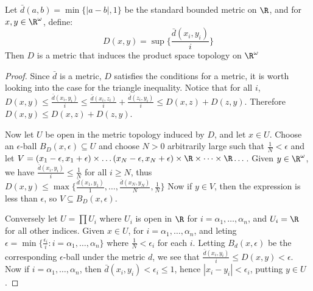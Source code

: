 \begin{theorem}\label{2.2.10}
    Let $\bar{d}(a,b)=\min\{|a-b|,1\}$ be the standard bounded metric on $\R$,
    and for  $x,y \in \R^\omega$, define:
    \begin{equation}
        D(x,y) = \sup\{\frac{\bar{d}(x_i,y_i)}{i}\}
    \end{equation}
    Then $D$ is a metric that induces the product space topology on $\R^\omega$
\end{theorem}
\begin{proof}
    Since $\bar{d}$ is a metric, $D$ satisfies the conditions for a metric, it
    is worth looking into the case for the triangle inequality. Notice that for
    all  $i$,  $D(x,y) \leq \frac{\bar{d}(x_i,y_i)}{i} \leq
    \frac{\bar{d}(x_i,z_i)}{i}+\frac{\bar{d}(z_i,y_i)}{i} \leq D(x,z)+D(z,y)$.
    Therefore $D(x,y) \leq D(x,z)+D(z,y)$.

    Now let $U$ be open in the metric topology induced by  $D$, and let  $x \in
    U$. Choose an  $\epsilon$-ball  $B_D(x,\epsilon) \subseteq U$ and choose
    $N>0$ arbitrarily large such that  $\frac{1}{N}<\epsilon$ and let
    $V=(x_1-\epsilon, x_1+\epsilon) \times \dots (x_N-\epsilon, x_N+\epsilon)
    \times \R \times \dots \times \R \dots$. Given $y \in \R^\omega$, we have
    $\frac{\bar{d}(x_i,y_i)}{i} \leq \frac{1}{N}$ for all $i \geq N$, thus
    $D(x,y) \leq \max\{\frac{\bar{d}(x_1,y_1)}{1}, \dots,
        \frac{\bar{d}(x_N,y_N)}{N}, \frac{1}{N}\}$ Now if $y \in V$, then the
        expression is less than  $\epsilon$, so  $V \subseteq B_D(x, \epsilon)$.

        Conversely let $U=\prod{U_i}$ where $U_i$ is open in  $\R$ for  $i =
        \alpha_1, \dots, \alpha_n$, and $U_i=\R$ for all other indices. Given
        $x \in U$, for $i=\alpha_1, \dots, \alpha_n$, and leting $\epsilon=
        \min\{\frac{\epsilon_i}{i} : i=\alpha_1, \dots, \alpha_n \}$ where
        $\frac{1}{N} < \epsilon_i$ for each $i$. Letting  $B_d(x,\epsilon)$ be
        the corresponding $\epsilon$-ball under the metric $d$, we see that
        $\frac{\bar{d}(x_i,y_i)}{i} \leq D(x,y)<\epsilon$. Now if $i=\alpha_1,
        \dots, \alpha_n$, then  $\bar{d}(x_i,y_i)<\epsilon_i \leq 1$, hence
        $|x_i-y_i|<\epsilon_i$, putting  $y \in U$.
\end{proof}

